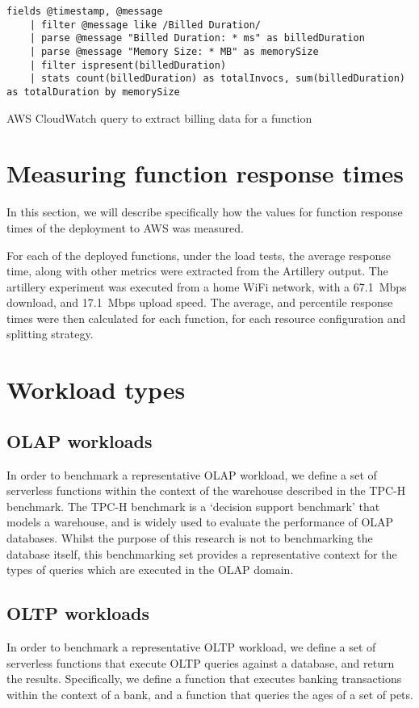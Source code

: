 \begin{listing}
\begin{verbatim}
fields @timestamp, @message
    | filter @message like /Billed Duration/
    | parse @message "Billed Duration: * ms" as billedDuration
    | parse @message "Memory Size: * MB" as memorySize
    | filter ispresent(billedDuration)
    | stats count(billedDuration) as totalInvocs, sum(billedDuration) as totalDuration by memorySize
\end{verbatim}
\caption{AWS CloudWatch query to extract billing data for a \faaas{} function}
\label{lst:total-cost-cloudwatch-query}
\end{listing}

\section{Measuring function response times}
In this section, we will describe specifically how the values for function response times of the \faaas{} deployment to AWS was measured.

For each of the deployed functions, under the load tests, the average response time, along with other metrics were extracted from the Artillery output. The artillery experiment was executed from a home WiFi network, with a \SI{67.1}{Mbps} download, and \SI{17.1}{Mbps} upload speed. The average, and percentile response times were then calculated for each function, for each resource configuration and splitting strategy.

\section{Workload types}
\subsection{OLAP workloads}
In order to benchmark a representative OLAP workload, we define a set of serverless functions within the context of the warehouse described in the TPC-H benchmark. The TPC-H benchmark is a `decision support benchmark' that models a warehouse, and is widely used to evaluate the performance of OLAP databases. Whilst the purpose of this research is not to benchmarking the database itself, this benchmarking set provides a representative context for the types of queries which are executed in the OLAP domain.

\subsection{OLTP workloads}
In order to benchmark a representative OLTP workload, we define a set of serverless functions that execute OLTP queries against a database, and return the results. Specifically, we define a function that executes banking transactions within the context of a bank, and a function that queries the ages of a set of pets.

